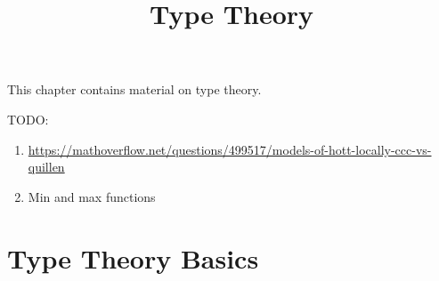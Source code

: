 

%



\title{Type Theory}

\maketitle

\label{section-phantom}

This chapter contains material on type theory.

\ChapterTableOfContents

TODO:
\begin{enumerate}
    \item \url{https://mathoverflow.net/questions/499517/models-of-hott-locally-ccc-vs-quillen}
    \item Min and max functions
\end{enumerate}

\section{Type Theory Basics}\label{section-type-theory-basics}

